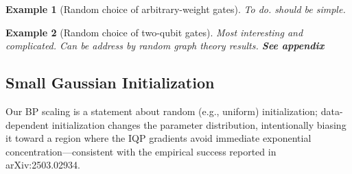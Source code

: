 \documentclass[a4paper,onecolumn,notitlepage,nofootinbib,longbibliography,superscriptaddress, floatfix, pra, aps, 10pt]{revtex4-2}
\newtheorem{example}{Example}
\begin{document}
\begin{example}[Random choice of arbitrary-weight gates] To do. should be simple.
\end{example}

\begin{example}[Random choice of two-qubit gates] Most interesting and complicated. Can be address by random graph theory results. \textbf{See appendix}
\end{example}


\subsection{Small Gaussian Initialization}
Our BP scaling is a statement about random (e.g., uniform) initialization; data-dependent initialization changes the parameter distribution, intentionally biasing it toward a region where the IQP gradients avoid immediate exponential concentration—consistent with the empirical success reported in arXiv:2503.02934.
\end{document}
